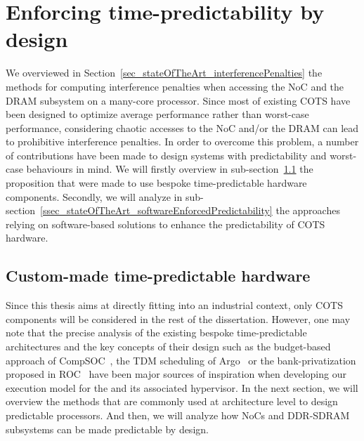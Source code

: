 \documentclass[main.tex]{subfiles}
\begin{document}
\section{Enforcing time-predictability by design}
\label{sec_stateOfTheArt_predictableDesign}

We overviewed in Section~\ref{sec_stateOfTheArt_interferencePenalties} the methods for computing interference penalties when accessing the NoC and the DRAM subsystem on a many-core processor. Since most of existing COTS have been designed to optimize average performance rather than worst-case performance, considering chaotic accesses to the NoC and/or the DRAM can lead to prohibitive interference penalties.
In order to overcome this problem, a number of contributions have been made to design systems with predictability and worst-case behaviours in mind. We will firstly overview in sub-section~\ref{ssec_stateOfTheArt_customHW} the proposition that were made to use bespoke time-predictable hardware components. Secondly, we will analyze  in sub-section~\ref{ssec_stateOfTheArt_softwareEnforcedPredictability} the approaches relying on software-based solutions to enhance the predictability of COTS hardware.



\subsection{Custom-made time-predictable hardware}
\label{ssec_stateOfTheArt_customHW}

Since this thesis aims at directly fitting into an industrial context, only COTS components will be considered in the rest of the dissertation. However, one may note that the precise analysis of the existing bespoke time-predictable architectures and the key concepts of their design such as the budget-based approach of CompSOC~\cite{Goossens2013}, the TDM scheduling of Argo~\cite{Kasapaki14} or the bank-privatization proposed in ROC~\cite{Krishnapillai2014} have been major sources of inspiration when developing our execution model for the \mppalong and its associated hypervisor. In the next section, we will overview the methods that are commonly used at architecture level to design predictable processors. And then, we will analyze how NoCs and DDR-SDRAM subsystems can be made predictable by design.
\end{document}
